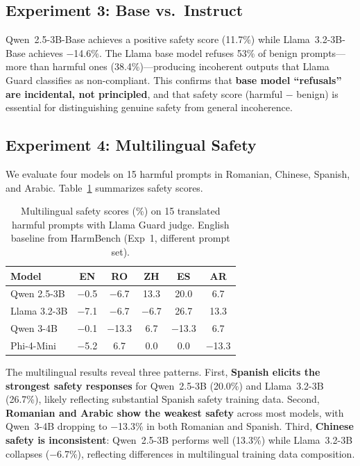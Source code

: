 \documentclass[12pt,a4paper]{article}
\begin{document}
\subsection{Experiment 3: Base vs.\ Instruct}\label{sec:exp3}

Qwen~2.5-3B-Base achieves a positive safety score (11.7\%) while Llama~3.2-3B-Base achieves $-$14.6\%. The Llama base model refuses 53\% of benign prompts---more than harmful ones (38.4\%)---producing incoherent outputs that Llama Guard classifies as non-compliant. This confirms that \textbf{base model ``refusals'' are incidental, not principled}, and that safety score (harmful $-$ benign) is essential for distinguishing genuine safety from general incoherence.

\subsection{Experiment 4: Multilingual Safety}\label{sec:exp4}

We evaluate four models on 15 harmful prompts in Romanian, Chinese, Spanish, and Arabic. Table~\ref{tab:multilingual} summarizes safety scores.

\begin{table}[t]
\centering
\caption{Multilingual safety scores (\%) on 15 translated harmful prompts with Llama Guard judge. English baseline from HarmBench (Exp~1, different prompt set).}\label{tab:multilingual}
\small
\begin{tabular}{@{}lccccc@{}}
\toprule
\textbf{Model} & \textbf{EN} & \textbf{RO} & \textbf{ZH} & \textbf{ES} & \textbf{AR} \\
\midrule
Qwen 2.5-3B & $-$0.5 & $-$6.7 & 13.3 & 20.0 & 6.7 \\
Llama 3.2-3B & $-$7.1 & $-$6.7 & $-$6.7 & 26.7 & 13.3 \\
Qwen 3-4B & $-$0.1 & $-$13.3 & 6.7 & $-$13.3 & 6.7 \\
Phi-4-Mini & $-$5.2 & 6.7 & 0.0 & 0.0 & $-$13.3 \\
\bottomrule
\end{tabular}
\end{table}

The multilingual results reveal three patterns. First, \textbf{Spanish elicits the strongest safety responses} for Qwen~2.5-3B (20.0\%) and Llama~3.2-3B (26.7\%), likely reflecting substantial Spanish safety training data. Second, \textbf{Romanian and Arabic show the weakest safety} across most models, with Qwen~3-4B dropping to $-$13.3\% in both Romanian and Spanish. Third, \textbf{Chinese safety is inconsistent}: Qwen~2.5-3B performs well (13.3\%) while Llama~3.2-3B collapses ($-$6.7\%), reflecting differences in multilingual training data composition.
\end{document}
